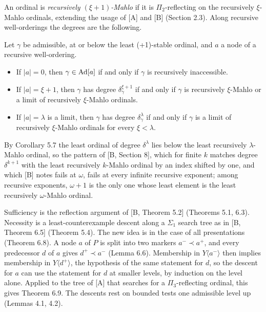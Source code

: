 \documentclass[11pt]{article}
\begin{document}
An ordinal is \emph{recursively $(\xi+1)$-Mahlo} if it is $\Pi_2$-reflecting on the recursively $\xi$-Mahlo ordinals,
extending the usage of [A] and [B] (Section 2.3).
Along recursive well-orderings the degrees are the following.

\begin{statement} Let $\gamma$ be admissible, at or below the least
(+1)-stable ordinal, and $a$ a node of a
recursive well-ordering.
\begin{itemize}
\item[(a)] If $|a| = 0$, then $\gamma \in \mathrm{Ad}[a]$ if and only if $\gamma$ is recursively inaccessible.
\item[(b)] If $|a| = \xi+1$, then $\gamma$ has degree $\delta_\gamma^{\xi+1}$ if and only if $\gamma$ is recursively
  $\xi$-Mahlo or a limit of recursively $\xi$-Mahlo ordinals.
\item[(c)] If $|a| = \lambda$ is a limit, then $\gamma$ has degree $\delta_\gamma^\lambda$ if and only if $\gamma$ is a
  limit of recursively $\xi$-Mahlo ordinals for every $\xi < \lambda$.
\end{itemize}
\end{statement}

By Corollary 5.7 the least ordinal of degree $\delta^\lambda$ lies below the least recursively
$\lambda$-Mahlo ordinal, so the pattern of [B, Section 8], which for finite $k$ matches degree $\delta^{k+1}$ with the least recursively
$k$-Mahlo ordinal by an index shifted by one, and which [B] notes fails at $\omega$, fails at every infinite recursive
exponent; among recursive exponents, $\omega+1$ is the
only one whose least element is the least recursively $\omega$-Mahlo ordinal.

Sufficiency is the reflection argument of [B, Theorem 5.2] (Theorems 5.1, 6.3). Necessity is a least-counterexample
descent along a $\Sigma_1$ search tree as in [B, Theorem 6.5] (Theorem 5.4). The new idea is in the case of all
presentations (Theorem 6.8). A node $a$ of $P$ is split into two
markers $a^- \prec a^+$, and every predecessor $d$ of $a$ gives $d^+ \prec a^-$ (Lemma 6.6). Membership in $Y\langle
a^-\rangle$ then implies membership in $Y\langle d^+\rangle$, the hypothesis of the same statement for $d$, so the
descent for $a$ can use the statement for $d$ at smaller levels, by induction on the level alone. Applied to the tree
of [A] that searches for a $\Pi_3$-reflecting ordinal, this gives Theorem 6.9. The descents rest on bounded tests one
admissible level up (Lemmas 4.1, 4.2).
\end{document}
